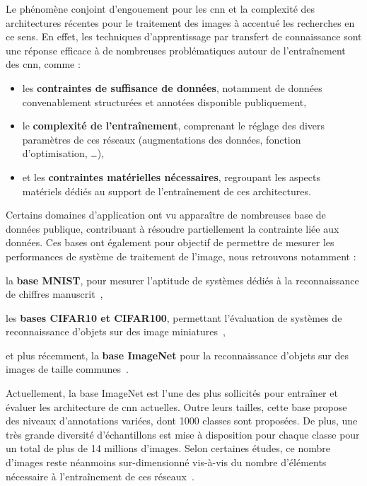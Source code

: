 Le phénomène conjoint d'engouement pour les \gls{cnn} et la complexité des architectures récentes pour le traitement des images à accentué les recherches en ce sens. En effet, les techniques d'apprentissage par transfert de connaissance sont une réponse efficace à de nombreuses problématiques autour de l'entraînement des \gls{cnn}, comme : 
\begin{itemize}
    \item les \textbf{contraintes de suffisance de données}, notamment de données convenablement structurées et annotées disponible publiquement,
    \item le \textbf{complexité de l'entraînement}, comprenant le réglage des divers paramètres de ces réseaux (augmentations des données, fonction d'optimisation, \ldots),
    \item et les \textbf{contraintes matérielles nécessaires}, regroupant les aspects matériels dédiés au support de l'entraînement de ces architectures.
\end{itemize}\par

Certains domaines d'application ont vu apparaître de nombreuses base de données publique, contribuant à résoudre partiellement la contrainte liée aux données. Ces bases ont également pour objectif de permettre de mesurer les performances de système de traitement de l'image, nous retrouvons notamment : 
\begin{inlinerate}
    \item la \textbf{base MNIST}, pour mesurer l'aptitude de systèmes dédiés à la reconnaissance de chiffres manuscrit~\cite{lecun2010},
    \item les \textbf{bases CIFAR10 et CIFAR100}, permettant l'évaluation de systèmes de reconnaissance d'objets sur des image miniatures~\cite{Krizhevsky}, 
    \item et plus récemment, la \textbf{base ImageNet} pour la reconnaissance d'objets sur des images de taille communes~\cite{Deng2008}. 
\end{inlinerate}\par

Actuellement, la base ImageNet est l'une des plus sollicités pour entraîner et évaluer les architecture de \gls{cnn} actuelles. Outre leurs tailles, cette base propose des niveaux d'annotations variées, dont 1000 classes sont proposées. De plus, une très grande diversité d'échantillons est mise à disposition pour chaque classe pour un total de plus de 14 millions d'images. Selon certaines études, ce nombre d'images reste néanmoins sur-dimensionné vis-à-vis du nombre d'éléments nécessaire à l'entraînement de ces réseaux~\cite{Huh2016}.\par


